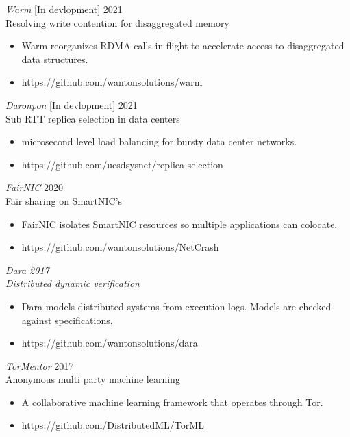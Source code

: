 \documentclass[line,margin]{res}
\begin{document}
\begin{resume}
{\sl Warm} [In devlopment] \hfill 2021\\
    Resolving write contention for disaggregated memory
\begin{itemize} \itemsep -2pt
        \item Warm reorganizes RDMA calls in flight to accelerate access to disaggregated data structures.
        \item https://github.com/wantonsolutions/warm
\end{itemize}

{\sl Daronpon} [In devlopment] \hfill 2021\\
    Sub RTT replica selection in data centers
\begin{itemize} \itemsep -2pt
        \item microsecond level load balancing for bursty data center networks.
        \item https://github.com/ucsdsysnet/replica-selection
\end{itemize}

{\sl FairNIC } \hfill 2020\\
    Fair sharing on SmartNIC's
\begin{itemize} \itemsep -2pt
        \item FairNIC isolates SmartNIC resources so multiple applications can colocate.
        \item https://github.com/wantonsolutions/NetCrash
\end{itemize}

{\sl Dara \hfill 2017\\
    Distributed dynamic verification
\begin{itemize} \itemsep -2pt
        \item Dara models distributed systems from execution logs. Models are checked against specifications.
        \item https://github.com/wantonsolutions/dara
\end{itemize}

{\sl TorMentor} \hfill 2017\\
    Anonymous multi party machine learning
\begin{itemize} \itemsep -2pt
        \item A collaborative machine learning framework that operates through Tor.
        \item https://github.com/DistributedML/TorML
\end{itemize}

}
\end{resume}
\end{document}

